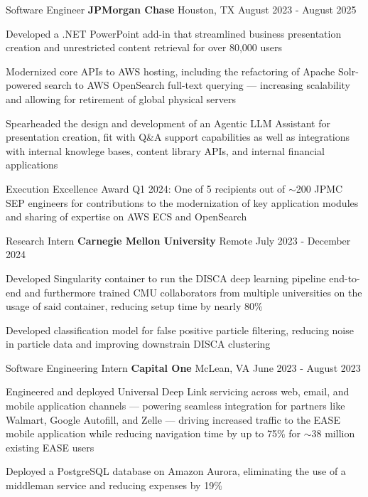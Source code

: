 
\begin{cventries}
  \cventry
    {Software Engineer}
    {\textbf{JPMorgan Chase}}
    {Houston, TX}
    {August 2023 - August 2025}
    {
      \begin{cvitems}
        \item{Developed a .NET PowerPoint add-in that streamlined business presentation creation and unrestricted content retrieval for over 80,000 users}
        \item{Modernized core APIs to AWS hosting, including the refactoring of Apache Solr-powered search to AWS OpenSearch full-text querying --- increasing scalability and allowing for retirement of global physical servers}
        \item{Spearheaded the design and development of an Agentic LLM Assistant for presentation creation, fit with Q\&A support capabilities as well as integrations with internal knowlege bases, content library APIs, and internal financial applications}
        \item{Execution Excellence Award Q1 2024: One of 5 recipients out of $\sim$200 JPMC SEP engineers for contributions to the modernization of key application modules and sharing of expertise on AWS ECS and OpenSearch}
      \end{cvitems}
    }

  \cventry
    {Research Intern}
    {\textbf{Carnegie Mellon University}}
    {Remote}
    {July 2023 - December 2024}
    {
      \begin{cvitems}
        \item{Developed Singularity container to run the DISCA deep learning pipeline end-to-end and furthermore trained CMU collaborators from multiple universities on the usage of said container, reducing setup time by nearly 80\%}
        \item{Developed classification model for false positive particle filtering, reducing noise in particle data and improving downstrain DISCA clustering}
      \end{cvitems}
    }

  \cventry
    {Software Engineering Intern}
    {\textbf{Capital One}}
    {McLean, VA}
    {June 2023 - August 2023}
    {
      \begin{cvitems}
        \item{Engineered and deployed Universal Deep Link servicing across web, email, and mobile application channels --- powering seamless integration for partners like Walmart, Google Autofill, and Zelle --- driving increased traffic to the EASE mobile application while reducing navigation time by up to 75\% for $\sim$38 million existing EASE users}
        \item{Deployed a PostgreSQL database on Amazon Aurora, eliminating the use of a middleman service and reducing expenses by 19\%}
      \end{cvitems}
    }


\end{cventries}
